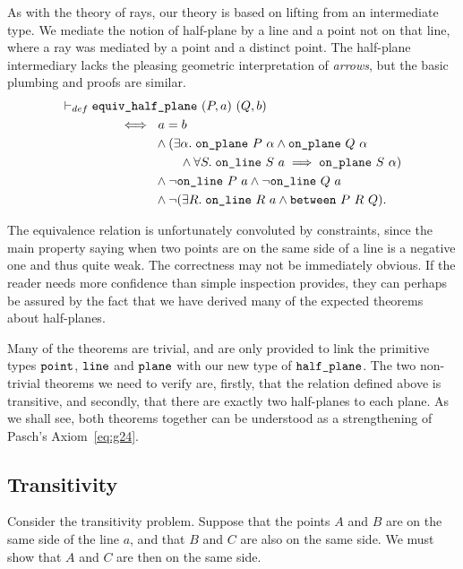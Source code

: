 As with the theory of rays, our theory is based on lifting from an intermediate type. We mediate the notion of half-plane by a line and a point not on that line, where a ray was mediated by a point and a distinct point. The half-plane intermediary lacks the pleasing geometric interpretation of \emph{arrows}, but the basic plumbing and proofs are similar.
\begin{equation}\label{eq:SameSidePlaneDef}
  \begin{split}
    \vdash_{def}\;& \code{equiv\_half\_plane}\ (P,a)\ (Q,b)\\
    & \qquad\iff\ a=b \\
    & \qquad\quad\qquad \wedge (\exists \alpha.\; \code{on\_plane}\ P\ \alpha \wedge \code{on\_plane}\ Q\ \alpha\\
    & \qquad\quad\qquad\qquad \wedge \forall S.\;\code{on\_line}\ S\ a \implies \code{on\_plane}\ S\ \alpha)\\
    & \qquad\quad\qquad \wedge \neg\code{on\_line}\ P\ a \wedge \neg\code{on\_line}\ Q\ a\\
    & \qquad\quad\qquad \wedge \neg(\exists R.\; \code{on\_line}\ R\ a \wedge \between{P}{R}{Q}).
  \end{split}
\end{equation}

The equivalence relation is unfortunately convoluted by constraints, since the main property saying when two points are on the same side of a line is a negative one and thus quite weak. The correctness may not be immediately obvious. If the reader needs more confidence than simple inspection provides, they can perhaps be assured by the fact that we have derived many of the expected theorems about half-planes. 

Many of the theorems are trivial, and are only provided to link the primitive types $\texttt{point}$, $\texttt{line}$ and $\texttt{plane}$ with our new type of $\texttt{half\_plane}$. The two non-trivial theorems we need to verify are, firstly, that the relation defined above is transitive, and secondly, that there are exactly two half-planes to each plane. As we shall see, both theorems together can be understood as a strengthening of Pasch's Axiom~\eqref{eq:g24}.

\subsection{Transitivity}
Consider the transitivity problem. Suppose that the points $A$ and $B$ are on the same side of the line $a$, and that $B$ and $C$ are also on the same side. We must show that $A$ and $C$ are then on the same side.

